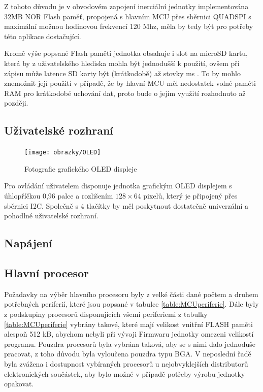 Z tohoto důvodu je v obvodovém zapojení inerciální jednotky implementována 32MB NOR Flash paměť, propojená s hlavním MCU přes sběrnici QUADSPI s maximální možnou hodinovou frekvencí 120 Mhz, měla by tedy být pro potřeby této aplikace dostačující. \cite{CgaRYSTpwKhEZZr7}

Kromě výše popsané Flash paměti jednotka obsahuje i slot na microSD kartu, která by z uživatelského hlediska mohla být jednodušší k použití, ovšem při zápisu může latence SD karty být (krátkodobě) až stovky ms \cite{Kraewinkel2020}. To by mohlo znemožnit její použití v případě, že by hlavní MCU měl nedostatek volné paměti RAM pro krátkodobé uchování dat, proto bude o jejím využití rozhodnuto až později.

\subsection{Uživatelské rozhraní}
\begin{figure}[h]
    \centering
    \texttt{[image: obrazky/OLED]}
    \caption{Fotografie grafického OLED displeje}
\end{figure}
Pro ovládání uživatelem disponuje jednotka grafickým OLED displejem s úhlopříčkou 0,96 palce a rozlišením $ 128 \times 64 $ pixelů, který je připojený přes sběrnici I2C. Společně s 4 tlačítky by měl poskytnout dostatečně univerzální a pohodlné uživatelské rozhraní.

\subsection{Napájení}
\subsection{Hlavní procesor}
Požadavky na výběr hlavního procesoru byly z velké části dané počtem a druhem potřebných periferií, které jsou popsané v tabulce \ref{table:MCUperiferie}.
Dále byly z podskupiny procesorů disponujících všemi periferiemi z tabulky \ref{table:MCUperiferie} vybrány takové, které mají velikost vnitřní FLASH paměti alespoň 512 kB, abychom nebyli při vývoji Firmwaru jednotky omezeni velikostí programu. Pouzdra procesorů byla vybrána taková, aby se s nimi dalo jednoduše pracovat, z toho důvodu byla vyloučena pouzdra typu BGA. 
V neposlední řadě byla zvážena i dostupnost vybíraných procesorů u nejobvyklejších distributorů elektronických součástek, aby bylo možné v případě potřeby výrobu jednotky opakovat.



